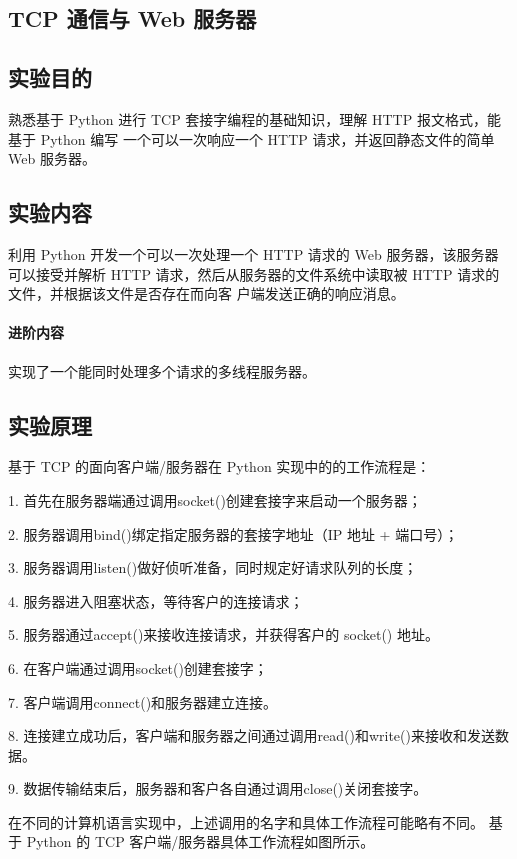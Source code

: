 \documentclass[a4paper,12pt]{report}
\begin{document}
\begin{spacing}{1.5}
\section{TCP 通信与 Web 服务器}

\subsection{实验目的}
熟悉基于 Python 进行 TCP 套接字编程的基础知识，理解 HTTP 报文格式，能基于 Python 编写 一个可以一次响应一个 HTTP 请求，并返回静态文件的简单 Web 服务器。

\subsection{实验内容}
利用 Python 开发一个可以一次处理一个 HTTP 请求的 Web 服务器，该服务器可以接受并解析 HTTP 请求，然后从服务器的文件系统中读取被 HTTP 请求的文件，并根据该文件是否存在而向客 户端发送正确的响应消息。

\paragraph*{进阶内容}
实现了一个能同时处理多个请求的多线程服务器。


\subsection{实验原理}
基于 TCP 的面向客户端/服务器在 Python 实现中的的工作流程是：

1. 首先在服务器端通过调用socket()创建套接字来启动一个服务器；

2. 服务器调用bind()绑定指定服务器的套接字地址（IP 地址 + 端口号）；

3. 服务器调用listen()做好侦听准备，同时规定好请求队列的长度；

4. 服务器进入阻塞状态，等待客户的连接请求；

5. 服务器通过accept()来接收连接请求，并获得客户的 socket() 地址。

6. 在客户端通过调用socket()创建套接字；

7. 客户端调用connect()和服务器建立连接。

8. 连接建立成功后，客户端和服务器之间通过调用read()和write()来接收和发送数据。

9. 数据传输结束后，服务器和客户各自通过调用close()关闭套接字。

在不同的计算机语言实现中，上述调用的名字和具体工作流程可能略有不同。
基于 Python 的 TCP 客户端/服务器具体工作流程如图所示。


\end{spacing}
\end{document}
